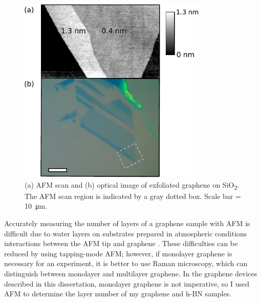 \documentclass[double,12pt,1in,seploa]{beavtex}
\begin{document}
\begin{figure}
    \centering
    \includegraphics[width = 9cm]{graphene layer comparison.pdf}
    \caption{(a) AFM scan and (b) optical image of exfoliated graphene on SiO\textsubscript{2}. The AFM scan region is indicated by a gray dotted box. Scale bar = \SI{10}{\micro\meter}.}
    \label{fig:graphenelayer}
\end{figure}
Accurately measuring the number of layers of a graphene sample with AFM is difficult due to water layers on substrates prepared in atmospheric conditions interactions between the AFM tip and graphene \cite{shearer_accurate_2016}. These difficulties can be reduced by using tapping-mode AFM; however, if monolayer graphene is necessary for an experiment, it is better to use Raman microscopy, which can distinguish between monolayer and multilayer graphene. In the graphene devices described in this dissertation, monolayer graphene is not imperative, so I used AFM to determine the layer number of my graphene and h-BN samples.
\end{document}
